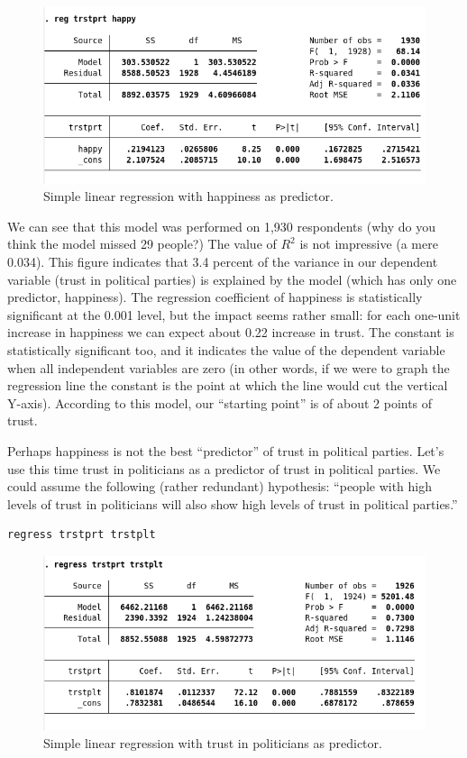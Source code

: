 \documentclass{article}
\begin{document}
\begin{figure}[H]
	\includegraphics[width=\linewidth]{../img/reg1.png}
	\caption{Simple linear regression with happiness as predictor.}
\end{figure}

We can see that this model was performed on 1,930 respondents (why do you think the model missed 29 people?) The value of $R^2$ is not impressive (a mere 0.034). This figure indicates that 3.4 percent of the variance in our dependent variable (trust in political parties) is explained by the model (which has only one predictor, happiness). The regression coefficient of happiness is statistically significant at the 0.001 level, but the impact seems rather small: for each one-unit increase in happiness we can expect about 0.22 increase in trust. The constant is statistically significant too, and it indicates the value of the dependent variable when all independent variables are zero (in other words, if we were to graph the regression line the constant is the point at which the line would cut the vertical Y-axis). According to this model, our ``starting point'' is of about 2 points of trust.

Perhaps happiness is not the best ``predictor'' of trust in political parties. Let's use this time trust in politicians as a predictor of trust in political parties. We could assume the following (rather redundant) hypothesis: ``people with high levels of trust in politicians will also show high levels of trust in political parties.''

\begin{lstlisting}
regress trstprt trstplt
\end{lstlisting}

\begin{figure}[H]
	\includegraphics[width=\linewidth]{../img/reg2.png}
	\caption{Simple linear regression with trust in politicians as predictor.}
\end{figure}
\end{document}
